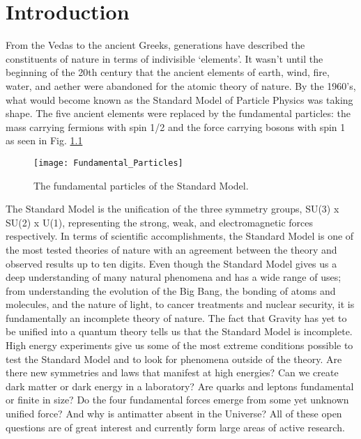 \chapter{Introduction} \label{ch:introduction}

From the Vedas to the ancient Greeks, generations have described the constituents of nature in terms of indivisible `elements'.  It wasn't until the beginning of the 20th century that the ancient elements of earth, wind, fire, water, and aether were abandoned for the atomic theory of nature.  By the 1960's, what would become known as the Standard Model of Particle Physics was taking shape.  The five ancient elements were replaced by the fundamental particles: the mass carrying fermions with spin 1/2 and the force carrying bosons with spin 1 as seen in Fig. \ref{fig:fundpart}
\begin{figure}[h]
\texttt{[image: Fundamental\_Particles]}
\centering
\caption{The fundamental particles of the Standard Model\cite{Patrignani:2016xqp}.}
\label{fig:fundpart}
\end{figure}
\par
The Standard Model is the unification of the three symmetry groups, SU(3) x SU(2) x U(1), representing the strong, weak, and electromagnetic forces respectively\cite{Langacker:2009my}.  In terms of scientific accomplishments, the Standard Model is one of the most tested theories of nature with an agreement between the theory and observed results up to ten digits\cite{Aoyama:2014sxa}.  Even though the Standard Model gives us a deep understanding of many natural phenomena and has a wide range of uses; from understanding the evolution of the Big Bang, the bonding of atoms and molecules, and the nature of light, to cancer treatments and nuclear security, it is fundamentally an incomplete theory of nature.  The fact that Gravity has yet to be unified into a quantum theory tells us that the Standard Model is incomplete.  High energy experiments give us some of the most extreme conditions possible to test the Standard Model and to look for phenomena outside of the theory.  Are there new symmetries and laws that manifest at high energies? Can we create dark matter or dark energy in a laboratory?  Are quarks and leptons fundamental or finite in size?  Do the four fundamental forces emerge from some yet unknown unified force?  And why is antimatter absent in the Universe?  All of these open questions are of great interest and currently form large areas of active research.  


